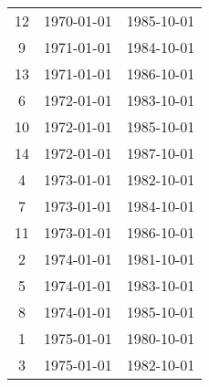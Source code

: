 % 
\begin{tabular}{ccc}
  \hline
  \hline
12 & 1970-01-01 & 1985-10-01 \\ 
  9 & 1971-01-01 & 1984-10-01 \\ 
  13 & 1971-01-01 & 1986-10-01 \\ 
  6 & 1972-01-01 & 1983-10-01 \\ 
  10 & 1972-01-01 & 1985-10-01 \\ 
  14 & 1972-01-01 & 1987-10-01 \\ 
  4 & 1973-01-01 & 1982-10-01 \\ 
  7 & 1973-01-01 & 1984-10-01 \\ 
  11 & 1973-01-01 & 1986-10-01 \\ 
  2 & 1974-01-01 & 1981-10-01 \\ 
  5 & 1974-01-01 & 1983-10-01 \\ 
  8 & 1974-01-01 & 1985-10-01 \\ 
  1 & 1975-01-01 & 1980-10-01 \\ 
  3 & 1975-01-01 & 1982-10-01 \\ 
   \hline
\end{tabular}
